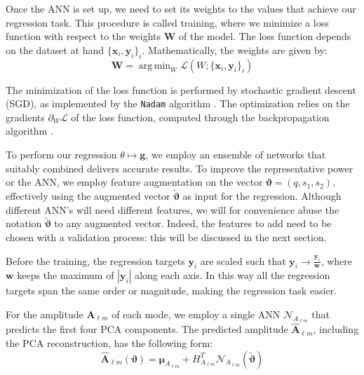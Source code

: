 \documentclass[twocolumn,showpacs,preprintnumbers,nofootinbib,prd,
superscriptaddress,10pt]{revtex4-1}
\DeclareMathOperator*{\argmin}{arg\,min}
\begin{document}
Once the ANN is set up, we need to set its weights to the values that achieve our regression task.
This procedure is called training, where we minimize a loss function with respect to the weights $\boldsymbol{W}$ of the model.
The loss function depends on the dataset at hand ${\{\boldsymbol{x}_i, \boldsymbol{y}_i\}_i}$.
Mathematically, the weights are given by:
%
\begin{equation}\label{eq:loss_general}
	\boldsymbol{W} = \argmin_W \mathcal{L}(W; \{\boldsymbol{x}_i, \boldsymbol{y}_i\}_i)
\end{equation}

The minimization of the loss function is performed by stochastic gradient descent (SGD), as implemented by the \texttt{Nadam} algorithm \cite{Kingma2014AdamAM, dozat.2016}. The optimization relies on the gradients $\partial_W \mathcal{L}$ of the loss function, computed through the backpropagation algorithm \cite{}.

To perform our regression $\theta \longmapsto \boldsymbol{g}$, we employ an ensemble of networks that suitably combined delivers accurate results.
To improve the representative power or the ANN, we employ feature augmentation on the vector $\boldsymbol{\vartheta} = (q, s_1, s_2)$, effectively using the augmented vector $\tilde{\boldsymbol{\vartheta}}$ as input for the regression. Although different ANN's will need different features, we will for convenience abuse the notation $\tilde{\boldsymbol{\vartheta}}$ to any augmented vector. Indeed, the features to add need to be chosen with a validation process: this will be discussed in the next section.

Before the training, the regression targets $\boldsymbol{y}_i$ are scaled such that $\boldsymbol{y}_i \rightarrow \frac{\boldsymbol{y}_i}{\boldsymbol{w}}$, where $\boldsymbol{w}$ keeps the maximum of $|\boldsymbol{y}_i|$ along each axis. %
In this way all the regression targets span the same order or magnitude, making the regression task easier.

For the amplitude $\boldsymbol{A}_{\ell m}$ of each mode, we employ a single ANN $\mathcal{N}_{A_{\ell m}}$ that predicts the first four PCA components.
The predicted amplitude $\hat{\boldsymbol{A}}_{\ell m}$, including the PCA reconstruction, has the following form:
\begin{equation}\label{eq:amp_pred}
	\hat{\boldsymbol{A}}_{\ell m}(\boldsymbol{\vartheta}) = \boldsymbol{\mu}_{A_{\ell m}} + H_{A_{\ell m}}^T \mathcal{N}_{A_{\ell m}}(\tilde{\boldsymbol{\vartheta}})
\end{equation}
\end{document}
